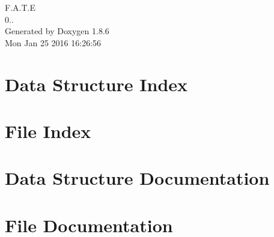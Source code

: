 \documentclass[twoside]{book}
\newcommand{\clearemptydoublepage}{%
  \newpage{\pagestyle{empty}\cleardoublepage}%
}
\begin{document}
\hypersetup{pageanchor=false}
\begin{titlepage}
\vspace*{7cm}
\begin{center}%
{\Large F.\-A.\-T.\-E \\[1ex]\large 0.. }\\
\vspace*{1cm}
{\large Generated by Doxygen 1.8.6}\\
\vspace*{0.5cm}
{\small Mon Jan 25 2016 16:26:56}\\
\end{center}
\end{titlepage}
\clearemptydoublepage
\tableofcontents
\clearemptydoublepage
{}
\hypersetup{pageanchor=true}

\chapter{Data Structure Index}

\chapter{File Index}

\chapter{Data Structure Documentation}
























\chapter{File Documentation}




































\newpage
{}
{}
\printindex
\end{document}
